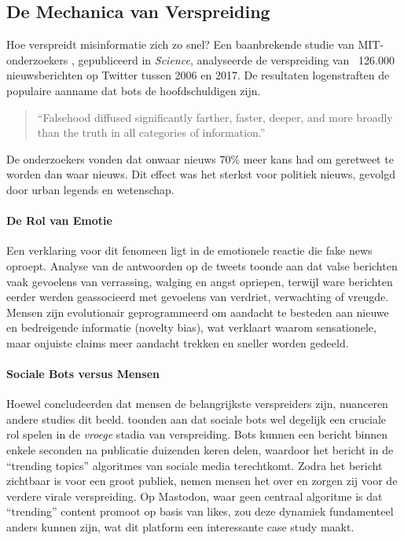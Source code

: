 \subsection{De Mechanica van Verspreiding}
Hoe verspreidt misinformatie zich zo snel? Een baanbrekende studie van MIT-onderzoekers \textcite{vosoughi2018spread}, gepubliceerd in \textit{Science}, analyseerde de verspreiding van ~126.000 nieuwsberichten op Twitter tussen 2006 en 2017. De resultaten logenstraften de populaire aanname dat bots de hoofdschuldigen zijn.
\begin{quote}
``Falsehood diffused significantly farther, faster, deeper, and more broadly than the truth in all categories of information.'' \autocite{vosoughi2018spread}
\end{quote}
De onderzoekers vonden dat onwaar nieuws 70\% meer kans had om geretweet te worden dan waar nieuws. Dit effect was het sterkst voor politiek nieuws, gevolgd door urban legends en wetenschap.

\paragraph{De Rol van Emotie}
Een verklaring voor dit fenomeen ligt in de emotionele reactie die fake news oproept. Analyse van de antwoorden op de tweets toonde aan dat valse berichten vaak gevoelens van verrassing, walging en angst opriepen, terwijl ware berichten eerder werden geassocieerd met gevoelens van verdriet, verwachting of vreugde. Mensen zijn evolutionair geprogrammeerd om aandacht te besteden aan nieuwe en bedreigende informatie (novelty bias), wat verklaart waarom sensationele, maar onjuiste claims meer aandacht trekken en sneller worden gedeeld.

\paragraph{Sociale Bots versus Mensen}
Hoewel \textcite{vosoughi2018spread} concludeerden dat mensen de belangrijkste verspreiders zijn, nuanceren andere studies dit beeld. \textcite{shao2018spread} toonden aan dat sociale bots wel degelijk een cruciale rol spelen in de \textit{vroege} stadia van verspreiding. Bots kunnen een bericht binnen enkele seconden na publicatie duizenden keren delen, waardoor het bericht in de ``trending topics'' algoritmes van sociale media terechtkomt. Zodra het bericht zichtbaar is voor een groot publiek, nemen mensen het over en zorgen zij voor de verdere virale verspreiding. Op Mastodon, waar geen centraal algoritme is dat ``trending'' content promoot op basis van likes, zou deze dynamiek fundamenteel anders kunnen zijn, wat dit platform een interessante case study maakt.

